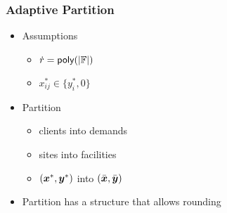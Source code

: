 \documentclass[handout, hyperref, dvipsnames]{beamer}
\begin{document}
\begin{frame}
  \frametitle{Adaptive Partition}
  \begin{itemize}
    \addtolength{\itemsep}{1\baselineskip}
    \item \Large{Assumptions}
      \begin{itemize}
      \item \large{${\dot r} = {\mbox{\sf poly}}(|\mathbb{F}|)$}
      \item \large{$x_{ij}^\ast \in \{y_i^\ast, 0\}$}
      \end{itemize}
    \item \Large{Partition}
       \begin{itemize}
       \item \large{clients into demands}
       \item \large{sites into facilities}
       \item \large{$(\boldsymbol{x}^\ast,\boldsymbol{y}^\ast)$ into $(\bar{\boldsymbol{x}}, \bar{\boldsymbol{y}})$}
       \end{itemize}
     \item \Large{Partition has a structure that allows rounding}
  \end{itemize}
\end{frame}
\end{document}
